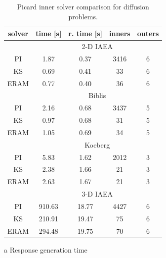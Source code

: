 \begin{table}[ht] 
 \begin{center} 
 
 \begin{threeparttable}

 
 \begin{tabular}{ccccc} 
 \toprule 
  solver & time [s] & r. time [s]\tnote{a} & inners & outers \\
 \midrule 
              &  \multicolumn{4}{c}{2-D IAEA} \\ 
 \midrule 
           PI &      1.87 &      0.37 &         3416 &            6 \\ 
           KS &      0.69 &      0.41 &           33 &            6 \\ 
         ERAM &      0.77 &      0.40 &           36 &            6 \\ 
 \midrule 
              &  \multicolumn{4}{c}{Biblis} \\ 
 \midrule 
           PI &      2.16 &      0.68 &         3437 &            5 \\ 
           KS &      0.97 &      0.68 &           31 &            5 \\ 
         ERAM &      1.05 &      0.69 &           34 &            5 \\ 
 \midrule 
              &  \multicolumn{4}{c}{Koeberg} \\ 
 \midrule 
           PI &      5.83 &      1.62 &         2012 &            3 \\ 
           KS &      2.38 &      1.66 &           21 &            3 \\ 
         ERAM &      2.63 &      1.67 &           21 &            3 \\ 
 \midrule 
              &  \multicolumn{4}{c}{3-D IAEA} \\ 
 \midrule 
           PI &    910.63 &     18.77 &         4427 &            6 \\ 
           KS &    210.91 &     19.47 &           75 &            6 \\ 
         ERAM &    294.48 &     19.75 &           70 &            6 \\ 
 \bottomrule 
 \end{tabular} 
 

 {\footnotesize
 \begin{tablenotes}
   \item[a] Response generation time
 \end{tablenotes}
 }
 \end{threeparttable}
 
 
 
 \end{center} 
 \caption{Picard inner solver comparison for diffusion problems.} 
 \label{tbl:diffusion_picard_inner_study} 
\end{table} 


